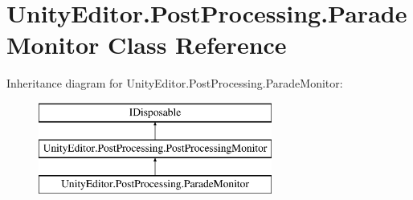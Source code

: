 \hypertarget{class_unity_editor_1_1_post_processing_1_1_parade_monitor}{}\section{Unity\+Editor.\+Post\+Processing.\+Parade\+Monitor Class Reference}
\label{class_unity_editor_1_1_post_processing_1_1_parade_monitor}
Inheritance diagram for Unity\+Editor.\+Post\+Processing.\+Parade\+Monitor\+:\begin{figure}[H]
\begin{center}
\leavevmode
\includegraphics[height=3.000000cm]{class_unity_editor_1_1_post_processing_1_1_parade_monitor}
\end{center}
\end{figure}
